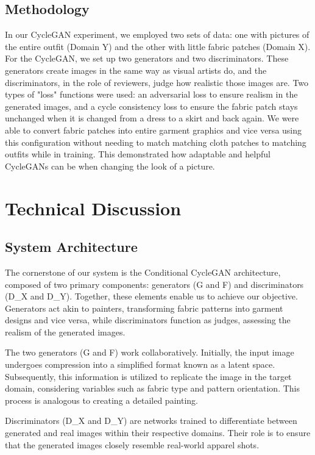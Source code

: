 \documentclass{article}
\begin{document}
\subsection{Methodology}
In our CycleGAN experiment, we employed two sets of data: one with pictures of the entire outfit (Domain Y) and the other with little fabric patches (Domain X). For the CycleGAN, we set up two generators and two discriminators. These generators create images in the same way as visual artists do, and the discriminators, in the role of reviewers, judge how realistic those images are. Two types of "loss" functions were used: an adversarial loss to ensure realism in the generated images, and a cycle consistency loss to ensure the fabric patch stays unchanged when it is changed from a dress to a skirt and back again. We were able to convert fabric patches into entire garment graphics and vice versa using this configuration without needing to match matching cloth patches to matching outfits while in training. This demonstrated how adaptable and helpful CycleGANs can be when changing the look of a picture.

\section{Technical Discussion}

\subsection{System Architecture}

The cornerstone of our system is the Conditional CycleGAN architecture, composed of two primary components: generators (G and F) and discriminators (D\_X and D\_Y). Together, these elements enable us to achieve our objective. Generators act akin to painters, transforming fabric patterns into garment designs and vice versa, while discriminators function as judges, assessing the realism of the generated images.

The two generators (G and F) work collaboratively. Initially, the input image undergoes compression into a simplified format known as a latent space. Subsequently, this information is utilized to replicate the image in the target domain, considering variables such as fabric type and pattern orientation. This process is analogous to creating a detailed painting.

Discriminators (D\_X and D\_Y) are networks trained to differentiate between generated and real images within their respective domains. Their role is to ensure that the generated images closely resemble real-world apparel shots.
\end{document}
